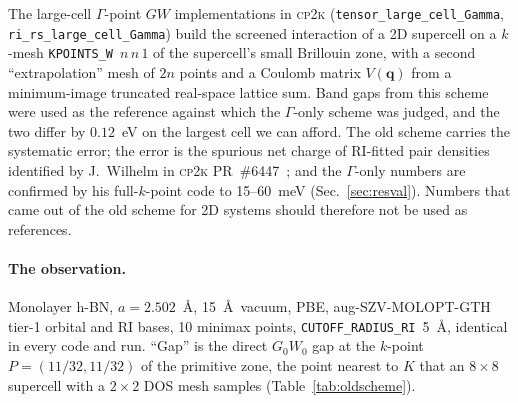 \documentclass[%
 reprint,
superscriptaddress,
 amsmath,amssymb,
 aps,
prb,
]{revtex4-2}
\newcommand{\bq}{\mathbf{q}}
\newcommand{\cpk}{\textsc{cp2k}}
\begin{document}
The large-cell $\Gamma$-point $GW$ implementations in \cpk{}
(\texttt{tensor\_large\_cell\_Gamma}, \texttt{ri\_rs\_large\_cell\_Gamma}) build the screened
interaction of a 2D supercell on a $k$-mesh \texttt{KPOINTS\_W}~$n\,n\,1$ of the supercell's
small Brillouin zone, with a second ``extrapolation'' mesh of $2n$ points and a Coulomb matrix
$V(\bq)$ from a minimum-image truncated real-space lattice sum. Band gaps from this scheme were
used as the reference against which the $\Gamma$-only scheme was judged, and the two differ by
$0.12$~eV on the largest cell we can afford. The old scheme carries the systematic error; the
error is the spurious net charge of RI-fitted pair densities identified by J.~Wilhelm in
\cpk{} PR~\#6447~\cite{pr6447}; and the $\Gamma$-only numbers are confirmed by his
full-$k$-point code to 15--60~meV (Sec.~\ref{sec:resval}). Numbers that came out of the old scheme for 2D systems
should therefore not be used as references.

\paragraph{The observation.} Monolayer h-BN, $a = 2.502$~\AA, 15~\AA\ vacuum, PBE,
aug-SZV-MOLOPT-GTH tier-1 orbital and RI bases, 10 minimax points,
\texttt{CUTOFF\_RADIUS\_RI}~5~\AA, identical in every code and run. ``Gap'' is the direct
$G_0W_0$ gap at the $k$-point $P = (11/32, 11/32)$ of the primitive zone, the point nearest to
$K$ that an $8\times8$ supercell with a $2\times2$ DOS mesh samples (Table~\ref{tab:oldscheme}).
\end{document}
